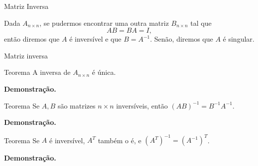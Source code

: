 \documentclass{beamer}
\begin{document}
\begin{darkframes}
\begin{frame}{Matriz Inversa}

Dada $A_{n\times n}$, se pudermos encontrar uma outra matriz $B_{n\times n}$ tal que 
 $$AB=BA=I,$$
 então diremos que $A$ é inversível e que $B=A^{-1}$. Senão, diremos que $A$ é singular.
\end{frame}

\begin{frame}{Matriz inversa}
 \begin{block}{Teorema}
   A inversa de $A_{n\times n}$ é única.
 \end{block}

\textbf{Demonstração.}  
\end{frame}

\begin{frame}{}
\begin{block}{Teorema}
Se $A, B$ são matrizes $n\times n$ inversíveis, então $(AB)^{-1} = B^{-1}A^{-1}$.
\end{block}

\textbf{Demonstração.} 
\end{frame}

\begin{frame}{}
\begin{block}{Teorema}
   Se $A$ é inversível, $A^T$ também o é, e $(A^T)^{-1} = (A^{-1})^T$.
\end{block}

\textbf{Demonstração.} 
\end{frame}

\end{darkframes}
\end{document}
